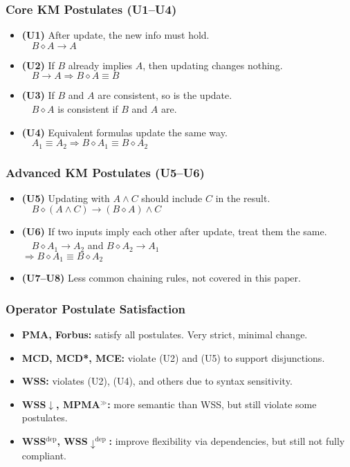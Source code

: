 \documentclass{beamer}
\begin{document}
\begin{frame}
\frametitle{Core KM Postulates (U1–U4)}
\begin{itemize}
    \item \textbf{(U1)} After update, the new info must hold. \\
    $\quad B \diamond A \rightarrow A$
    
    \item \textbf{(U2)} If $B$ already implies $A$, then updating changes nothing. \\
    $\quad B \rightarrow A \Rightarrow B \diamond A \equiv B$
    
    \item \textbf{(U3)} If $B$ and $A$ are consistent, so is the update. \\
    $\quad B \diamond A$ is consistent if $B$ and $A$ are.
    
    \item \textbf{(U4)} Equivalent formulas update the same way. \\
    $\quad A_1 \equiv A_2 \Rightarrow B \diamond A_1 \equiv B \diamond A_2$
\end{itemize}
\end{frame}

\begin{frame}
\frametitle{Advanced KM Postulates (U5–U6)}
\begin{itemize}
    \item \textbf{(U5)} Updating with $A \wedge C$ should include $C$ in the result. \\
    $\quad B \diamond (A \wedge C) \rightarrow (B \diamond A) \wedge C$
    
    \item \textbf{(U6)} If two inputs imply each other after update, treat them the same. \\
    $\quad B \diamond A_1 \rightarrow A_2$ and $B \diamond A_2 \rightarrow A_1$ \\
    $\Rightarrow B \diamond A_1 \equiv B \diamond A_2$
    
    \item \textbf{(U7–U8)} Less common chaining rules, not covered in this paper.
\end{itemize}
\end{frame}

\begin{frame}
\frametitle{Operator Postulate Satisfaction}
\begin{itemize}
    \item \textbf{PMA, Forbus:} satisfy all postulates. Very strict, minimal change.
    \item \textbf{MCD, MCD*, MCE:} violate (U2) and (U5) to support disjunctions.
    \item \textbf{WSS:} violates (U2), (U4), and others due to syntax sensitivity.
    \item \textbf{WSS$\downarrow$, MPMA$^{\gg}$:} more semantic than WSS, but still violate some postulates.
    \item \textbf{WSS$^{\text{dep}}$, WSS$\downarrow^{\text{dep}}$:} improve flexibility via dependencies, but still not fully compliant.
\end{itemize}
\end{frame}
\end{document}
